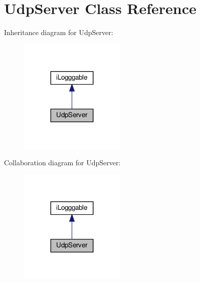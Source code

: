 \section{Udp\+Server Class Reference}
\label{class_udp_server}


Inheritance diagram for Udp\+Server\+:\nopagebreak
\begin{figure}[H]
\begin{center}
\leavevmode
\includegraphics[width=143pt]{class_udp_server__inherit__graph}
\end{center}
\end{figure}


Collaboration diagram for Udp\+Server\+:\nopagebreak
\begin{figure}[H]
\begin{center}
\leavevmode
\includegraphics[width=143pt]{class_udp_server__coll__graph}
\end{center}
\end{figure}
